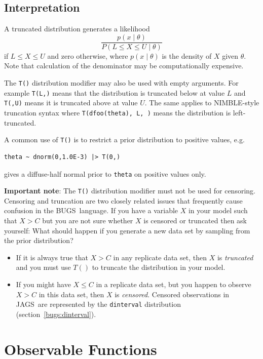 \documentclass[11pt, a4paper, titlepage]{report}
\newcommand{\JAGS}{\textsf{JAGS}}
\newcommand{\BUGS}{\textsf{BUGS}}
\begin{document}
\subsection{Interpretation}

A truncated distribution generates a likelihood
\[
\frac{p(x \mid \theta)}{P(L \leq X \leq U \mid \theta)}
\]
if $L \leq X \leq U$ and zero otherwise, where $p(x \mid \theta)$ is
the density of $X$ given $\theta$. Note that calculation of the
denominator may be computationally expensive.

The \texttt{T()} distribution modifier may also be used with empty
arguments.  For example \texttt{T(L,)} means that the distribution is
truncated below at value $L$ and \texttt{T(,U)} means it is truncated
above at value $U$. The same applies to NIMBLE-style truncation syntax
where \texttt{T(dfoo(theta), L, )} means the distribution is
left-truncated.

A common use of \texttt{T()} is to restrict a prior distribution to
positive values, e.g.
\begin{verbatim}
theta ~ dnorm(0,1.0E-3) |> T(0,)
\end{verbatim}
gives a diffuse-half normal prior to \texttt{theta} on positive values
only.

{\bf Important note}: The \texttt{T()} distribution modifier must not
be used for censoring. Censoring and truncation are two closely
related issues that frequently cause confusion in the
\BUGS\ language. If you have a variable $X$ in your model such that $X
> C$ but you are not sure whether $X$ is censored or truncated then
ask yourself: What should happen if you generate a new data set by
sampling from the prior distribution?
\begin{itemize}
\item If it is always true that $X > C$ in any replicate data set,
  then $X$ is {\em truncated} and you must use $T()$ to truncate
  the distribution in your model.
\item If you might have $X \leq C$ in a replicate data set, but you
  happen to observe $X > C$ in this data set, then $X$ is {\em
    censored}. Censored observations in \JAGS\ are represented by the
  \texttt{dinterval} distribution (section~\ref{bugs:dinterval}).
\end{itemize}

\section{Observable Functions}
\label{section:obfun}
\end{document}
